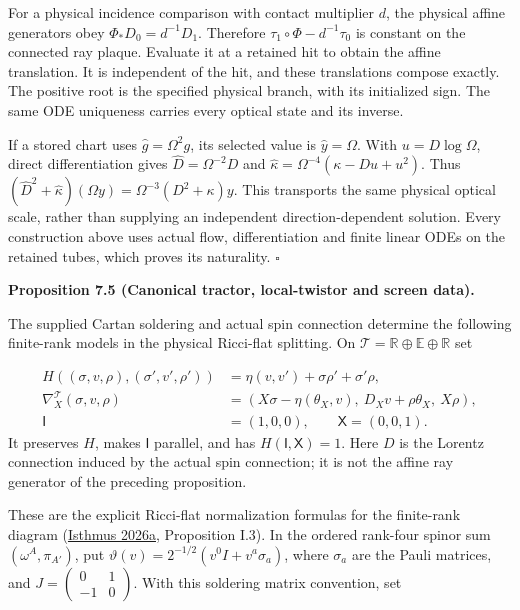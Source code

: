 \documentclass[
  english,
  11pt,
  reqno]{amsart}
\makeatletter
\newcommand{\pandocstatementheading}[1]{%
  \par\addpenalty{\@beginparpenalty}%
  \addvspace{.5\baselineskip plus .2\baselineskip minus .2\baselineskip}%
  {\normalfont\bfseries #1\par}%
  \nobreak\@afterindenttrue\@afterheading
}
\makeatother
\begin{document}
For a physical incidence comparison with contact multiplier \(d\), the
physical affine generators obey \(\Phi_*D_0=d^{-1}D_1\). Therefore
\(\tau_1\circ\Phi-d^{-1}\tau_0\) is constant on the connected ray
plaque. Evaluate it at a retained hit to obtain the affine translation.
It is independent of the hit, and these translations compose exactly.
The positive root is the specified physical branch, with its initialized
sign. The same ODE uniqueness carries every optical state and its
inverse.

If a stored chart uses \(\widehat g=\Omega^2g\), its selected value is
\(\widehat y=\Omega\). With \(u=D\log\Omega\), direct differentiation
gives \(\widehat D=\Omega^{-2}D\) and
\(\widehat\kappa=\Omega^{-4}(\kappa-Du+u^2)\). Thus
\((\widehat D^2+\widehat\kappa)(\Omega y)=\Omega^{-3}(D^2+\kappa)y\).
This transports the same physical optical scale, rather than supplying
an independent direction-dependent solution. Every construction above
uses actual flow, differentiation and finite linear ODEs on the retained
tubes, which proves its naturality. \hfill\(\square\)

\pandocstatementheading{\leavevmode{}\label{prop:online-canonical-finite-rank-models}Proposition 7.5 (Canonical tractor, local-twistor and screen data).}

The supplied Cartan soldering and actual spin connection determine the
following finite-rank models in the physical Ricci-flat splitting. On
\(\mathcal T=\mathbb R\oplus\mathbb E\oplus\mathbb R\) set

\label{eq:online-canonical-tractor-model} \[
\begin{aligned}
H((\sigma,v,\rho),(\sigma',v',\rho'))
&=\eta(v,v')+\sigma\rho'+\sigma'\rho,\\
\nabla_X^{\mathcal T}(\sigma,v,\rho)
&=(X\sigma-\eta(\theta_X,v),\ D_Xv+\rho\theta_X,\ X\rho),\\
\mathsf I&=(1,0,0),\qquad \mathsf X=(0,0,1).
\end{aligned}
\] It preserves \(H\), makes \(\mathsf I\) parallel, and has
\(H(\mathsf I,\mathsf X)=1\). Here \(D\) is the Lorentz connection
induced by the actual spin connection; it is not the affine ray
generator of the preceding proposition.

These are the explicit Ricci-flat normalization formulas for the
finite-rank diagram (\hyperref[ref-IsthmusLocal2026]{Isthmus 2026a},
Proposition I.3). In the ordered rank-four spinor sum
\((\omega^A,\pi_{A'})\), put
\(\vartheta(v)=2^{-1/2}(v^0I+v^a\sigma_a)\), where \(\sigma_a\) are the
Pauli matrices, and
\(J=\left(\begin{smallmatrix}0&1\\-1&0\end{smallmatrix}\right)\). With
this soldering matrix convention, set
\end{document}
